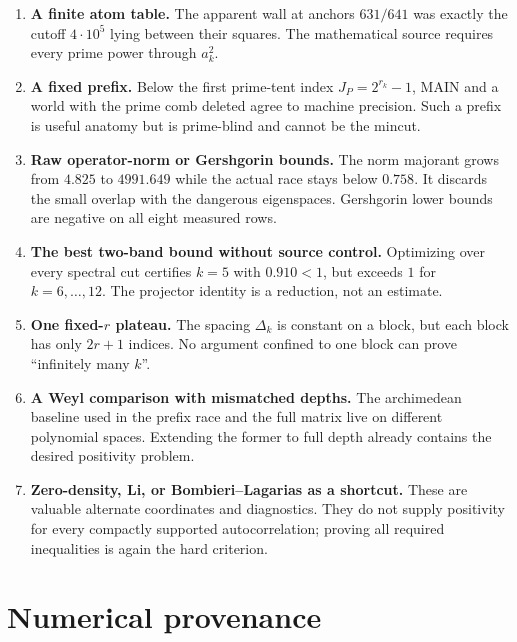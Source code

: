 \documentclass[11pt]{article}
\begin{document}
\begin{enumerate}
\item \textbf{A finite atom table.}
The apparent wall at anchors $631/641$ was exactly the cutoff
$4\cdot10^5$ lying between their squares.  The mathematical source
requires every prime power through $a_k^2$.

\item \textbf{A fixed prefix.}
Below the first prime-tent index
$J_P=2^{r_k}-1$, MAIN and a world with the prime comb deleted agree
to machine precision.  Such a prefix is useful anatomy but is
prime-blind and cannot be the mincut.

\item \textbf{Raw operator-norm or Gershgorin bounds.}
The norm majorant grows from $4.825$ to $4991.649$ while the actual
race stays below $0.758$.  It discards the small overlap with the
dangerous eigenspaces.  Gershgorin lower bounds are negative on all
eight measured rows.

\item \textbf{The best two-band bound without source control.}
Optimizing over every spectral cut certifies $k=5$ with $0.910<1$,
but exceeds $1$ for $k=6,\ldots,12$.  The projector identity is a
reduction, not an estimate.

\item \textbf{One fixed-$r$ plateau.}
The spacing $\Delta_k$ is constant on a block, but each block has
only $2r+1$ indices.  No argument confined to one block can prove
``infinitely many $k$''.

\item \textbf{A Weyl comparison with mismatched depths.}
The archimedean baseline used in the prefix race and the full matrix
live on different polynomial spaces.  Extending the former to full
depth already contains the desired positivity problem.

\item \textbf{Zero-density, Li, or Bombieri--Lagarias as a shortcut.}
These are valuable alternate coordinates and diagnostics.  They do
not supply positivity for every compactly supported
autocorrelation; proving all required inequalities is again the
hard criterion.
\end{enumerate}

\section{Numerical provenance}
\end{document}
